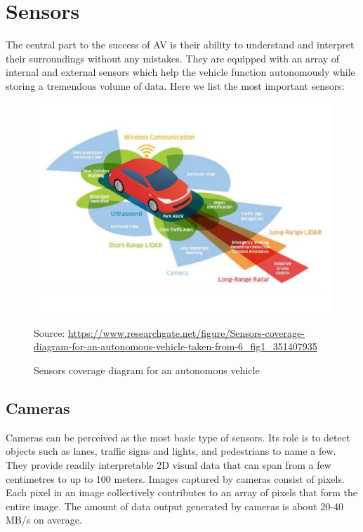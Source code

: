 \documentclass[10pt,oneside,english,a4paper]{article}
\begin{document}

\section{Sensors} \label{sensors}

\indent The central part to the success of AV is their ability to understand and interpret their surroundings without any mistakes. They are equipped with an array of internal and external sensors which help the vehicle function autonomously while storing a tremendous volume of data. Here we list the most important sensors:

\begin{figure}[!h]
\centering
\includegraphics[scale=0.4]{SensorsScheme.pdf}
\caption{Sensors coverage diagram for an autonomous vehicle}
{Source: \url{https://www.researchgate.net/figure/Sensors-coverage-diagram-for-an-autonomous-vehicle-taken-from-6_fig1_351407935}}
\label{fig:p_sensors}
\end{figure}


\subsection{Cameras}
\par Cameras can be perceived as the most basic type of sensors. Its role is to detect objects such as lanes, traffic signs and lights, and pedestrians to name a few. They provide readily interpretable 2D visual data that can span from a few centimetres to up to 100 meters. Images captured by cameras consist of pixels. Each pixel in an image collectively contributes to an array of pixels that form the entire image. The amount of data output generated by cameras is about 20-40 MB/s on average.
\end{document}
